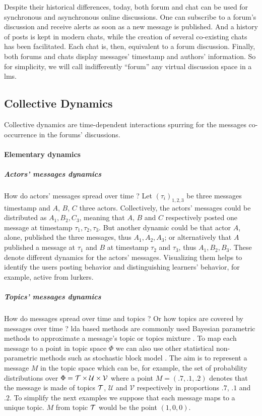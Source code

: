\documentclass[a4paper,twoside]{article}
\newcommand{\V}{\mathcal{V}}
\newcommand{\U}{\mathcal{U}}
\begin{document}
Despite their historical differences, today, both forum and chat can be used for synchronous and asynchronous online discussions.  One can subscribe to a forum's discussion and receive alerts as soon as a new message is published.  And a history of posts is kept in modern chats, while the creation of several co-existing chats has been facilitated.  Each chat is, then, equivalent to a forum discussion.  Finally, both forums and chats display messages' timestamp and authors' information.
So for simplicity, we will call indifferently ``forum'' any virtual discussion space in a \gls{lms}.

\subsection{Collective Dynamics}

Collective dynamics are time-dependent interactions spurring for the messages co-occurrence in the forums' discussions.

\paragraph{Elementary dynamics}

\subparagraph{Actors' messages dynamics}
How do actors' messages spread over time ? Let $(\tau_i)_{1, 2, 3}$ be three messages timestamp and $A$, $B$, $C$ three actors.  Collectively, the actors' messages could be distributed as $A_1, B_2,C_3$, meaning that $A$, $B$ and $C$ respectively posted one message at timestamp $\tau_1, \tau_2, \tau_3$.  But another dynamic could be that actor $A$, alone, published the three messages, thus $A_1, A_2, A_3$; or alternatively that $A$ published a message at $\tau_1$ and $B$ at timestamp $\tau_2$ and $\tau_3$, thus $A_1, B_2, B_3$.  These denote different dynamics for the actors' messages.  Visualizing them helps to identify the users posting behavior and distinguishing learners' behavior, for example, active from lurkers.


\subparagraph{Topics' messages dynamics}
How do messages spread over time and topics ? Or how topics are covered by messages over time ?
\gls{lda} based methods are commonly used Bayesian parametric methods to approximate a message's topic or topics mixture \citep{Jelodar2017}.  To map each message to a point in topic space $\Phi$ we can also use other statistical non-parametric methods such as stochastic block model \citep{Gerlach2018}.   The aim is to represent a message $M$ in the topic space which can be, for example, the set of probability distributions over $\Phi = \T\times \U \times \V$ where a point $M = (.7, .1, .2)$ denotes that the message is made of topics $\mathcal{T}$, $\U$ and $\V$ respectively in proportions $.7$, $.1$ and $.2$.  To simplify the next examples we suppose that each message maps to a unique topic.  $M$ from topic $\mathcal{T}$ would be the point $(1, 0, 0)$.
\end{document}
